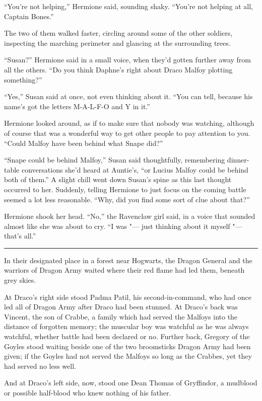 ``You're not helping,'' Hermione said, sounding shaky. ``You're not
helping at all, Captain Bones.''

The two of them walked faster, circling around some of the other
soldiers, inspecting the marching perimeter and glancing at the
surrounding trees.

``Susan?'' Hermione said in a small voice, when they'd gotten further
away from all the others. ``Do you think Daphne's right about Draco
Malfoy plotting something?''

``Yes,'' Susan said at once, not even thinking about it. ``You can tell,
because his name's got the letters M-A-L-F-O and Y in it.''

Hermione looked around, as if to make sure that nobody was watching,
although of course that was a wonderful way to get other people to pay
attention to you. ``Could Malfoy have been behind what Snape did?''

``Snape could be behind Malfoy,'' Susan said thoughtfully, remembering
dinner-table conversations she'd heard at Auntie's, ``or Lucius Malfoy
could be behind both of them.'' A slight chill went down Susan's spine
as this last thought occurred to her. Suddenly, telling Hermione to just
focus on the coming battle seemed a lot less reasonable. ``Why, did you
find some sort of clue about that?''

Hermione shook her head. ``No,'' the Ravenclaw girl said, in a voice
that sounded almost like she was about to cry. ``I was "--- just thinking
about it myself "--- that's all.''

\begin{center}\rule{3in}{0.4pt}\end{center}

In their designated place in a forest near Hogwarts, the Dragon General
and the warriors of Dragon Army waited where their red flame had led
them, beneath grey skies.

At Draco's right side stood Padma Patil, his second-in-command, who had
once led all of Dragon Army after Draco had been stunned. At Draco's
back was Vincent, the son of Crabbe, a family which had served the
Malfoys into the distance of forgotten memory; the muscular boy was
watchful as he was always watchful, whether battle had been declared or
no. Further back, Gregory of the Goyles stood waiting beside one of the
two broomsticks Dragon Army had been given; if the Goyles had not served
the Malfoys so long as the Crabbes, yet they had served no less well.

And at Draco's left side, now, stood one Dean Thomas of Gryffindor, a
mudblood or possible half-blood who knew nothing of his father.

